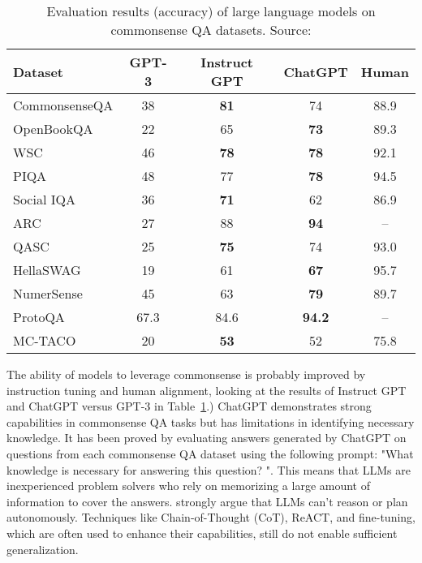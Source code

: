 \begin{table}[h!]
	\centering
	\small
	\begin{tabular}{|l|c|c|c|c|}
		\hline
		Dataset       & GPT-3 & Instruct GPT & ChatGPT       & Human \\
		\hline
		CommonsenseQA & 38    & \textbf{81}  & 74            & 88.9  \\
		OpenBookQA    & 22    & 65           & \textbf{73}   & 89.3  \\
		WSC           & 46    & \textbf{78}  & \textbf{78}   & 92.1  \\
		PIQA          & 48    & 77           & \textbf{78}   & 94.5  \\
		Social IQA    & 36    & \textbf{71}  & 62            & 86.9  \\
		ARC           & 27    & 88           & \textbf{94}   & --    \\
		QASC          & 25    & \textbf{75}  & 74            & 93.0  \\
		HellaSWAG     & 19    & 61           & \textbf{67}   & 95.7  \\
		NumerSense    & 45    & 63           & \textbf{79}   & 89.7  \\
		ProtoQA       & 67.3  & 84.6         & \textbf{94.2} & --    \\
		MC-TACO       & 20    & \textbf{53}  & 52            & 75.8  \\
		\hline
	\end{tabular}
	\caption{Evaluation results (accuracy) of large language models on commonsense QA datasets. Source: \textcite{bian2024chatgpt}}
	\label{tab:commonsense-results}
\end{table}
The ability of models to leverage commonsense is probably improved by instruction tuning and human alignment, looking at the results of Instruct GPT and ChatGPT versus GPT-3 in Table~\ref{tab:commonsense-results}.)
ChatGPT demonstrates strong capabilities in commonsense QA tasks but has limitations in identifying necessary knowledge.
It has been proved by evaluating answers generated by ChatGPT on questions from each commonsense QA dataset using the following prompt: "What knowledge is necessary for answering this question? ".
This means that LLMs are inexperienced problem solvers who rely on memorizing a large amount of information to cover the answers\cite{bian2024chatgpt}.
\textcite{subbarao2024canlanguagemodelsreasonplan, kambhampati2024llmscantplanhelp} strongly argue that LLMs can't reason or plan autonomously.
Techniques like Chain-of-Thought (CoT), ReACT, and fine-tuning, which are often used to enhance their capabilities, still do not enable sufficient generalization.
